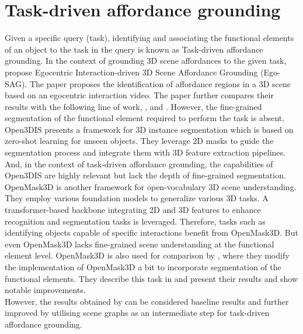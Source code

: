  \section{Task-driven affordance grounding}
Given a specific query (task), identifying and associating the functional elements of an object to the task in the query is known as Task-driven affordance grounding. 
In the context of grounding 3D scene affordances to the given task, \citet{liu2024grounding3dsceneaffordance} propose
 Egocentric Interaction-driven 3D Scene Affordance Grounding (Ego-SAG). The paper proposes the identification of affordance regions in a 3D scene based on 
 an egocentric interaction video. The paper further compares their results with the following line of work,
\cite{huang2024openins3dsnaplookup3d}, \cite{Nguyen_2024_CVPR} and \cite{takmaz2023openmask3dopenvocabulary3dinstance}. However, the fine-grained 
segmentation of the functional element required to perform the task is absent. Open3DIS presents a framework for 3D instance segmentation which is based on
zero-shot learning for unseen objects. They leverage 2D masks to guide the segmentation process and integrate them with 3D feature extraction pipelines. And, in the context
of task-driven affordance grounding, the capabilities of Open3DIS are highly relevant but lack the depth of fine-grained segmentation. OpenMask3D is another framework
 for open-vocabulary 3D scene understanding. They employ
various foundation models to generalize various 3D tasks. A transformer-based backbone integrating 2D and 3D features to enhance recognition and segmentation tasks is leveraged. 
Therefore, tasks such as identifying objects capable of specific interactions benefit from OpenMask3D. 
But even OpenMask3D lacks fine-grained scene understanding at the functional element level.
OpenMask3D \cite{takmaz2023openmask3dopenvocabulary3dinstance} is also used for comparison by
\citet{delitzas2024scenefun3d}, where they modify the implementation of OpenMask3D a bit to incorporate segmentation of the functional elements. 
They describe this task in \cite{delitzas2024scenefun3d} and present their results and show notable improvements.\\
However, the results obtained by \citet{delitzas2024scenefun3d}
can be considered baseline results and further improved by utilising scene graphs as an intermediate step for task-driven affordance grounding.
